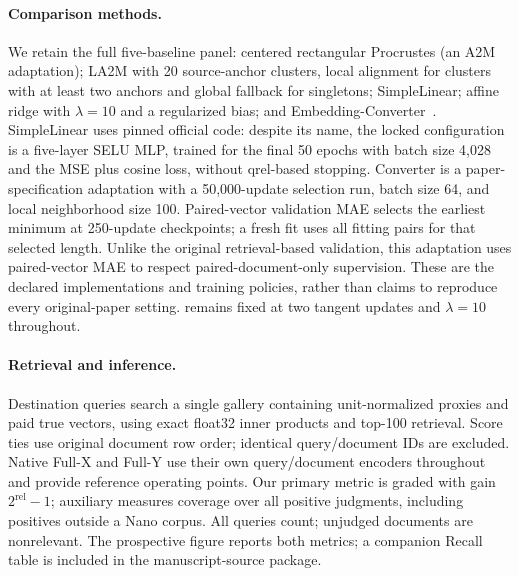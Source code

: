 \paragraph{Comparison methods.}
We retain the full five-baseline panel: centered rectangular Procrustes
(an A2M adaptation); LA2M with 20 source-anchor clusters, local alignment
for clusters with at least two anchors and global fallback for singletons;
SimpleLinear; affine ridge with $\lambda=10$
and a regularized bias; and Embedding-Converter~\cite{la2m,simplelinear,embeddingconverter}.
SimpleLinear uses pinned official code: despite its name, the locked
configuration is a five-layer SELU MLP, trained for the final 50 epochs with
batch size 4,028 and the MSE plus cosine loss, without qrel-based stopping.
Converter is a paper-specification adaptation with a 50,000-update
selection run, batch size 64, and local neighborhood size 100. Paired-vector
validation MAE selects the earliest minimum at 250-update checkpoints;
a fresh fit uses all fitting pairs for that selected length. Unlike the
original retrieval-based validation, this adaptation uses paired-vector MAE
to respect paired-document-only supervision. These are the
declared implementations and training policies, rather than claims to
reproduce every original-paper setting. \method{} remains fixed at two
tangent updates and $\lambda=10$ throughout.

\paragraph{Retrieval and inference.}
Destination queries search a single gallery containing unit-normalized
proxies and paid true vectors, using exact float32 inner products and
top-100 retrieval. Score ties use original document row order; identical
query/document IDs are excluded. Native Full-X and Full-Y use their own
query/document encoders throughout and provide reference operating points.
Our primary metric is graded \ndcg{} with gain $2^{\mathrm{rel}}-1$; auxiliary
\recall{} measures coverage over all
positive judgments, including positives outside a Nano corpus. All queries
count; unjudged documents are nonrelevant. The prospective figure reports both
metrics; a companion Recall table is included in the manuscript-source package.

